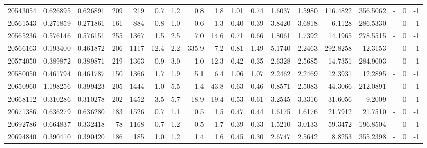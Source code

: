 \begin{tabular}{rrrrrrrrrrrrrrrlrr}
  20543054 & 0.626895 &   0.626891 &  209 &  219 &      0.7 &      1.2 &     0.8 &      1.8 &       1.01 &        0.74 &  1.6037 &  1.5980 &  116.4822 &  356.5062 &             - &        0 &         -1 \\
  20561543 & 0.271859 &   0.271861 &  161 &  884 &      0.8 &      1.0 &     0.6 &      1.3 &       0.40 &        0.39 &  3.8420 &  3.6818 &    6.1128 &  286.5330 &             - &        0 &         -1 \\
  20565236 & 0.576146 &   0.576151 &  255 & 1367 &      1.5 &      2.5 &     7.0 &     14.6 &       0.71 &        0.66 &  1.8061 &  1.7392 &   14.1965 &  278.5515 &             - &        0 &         -1 \\
  20566163 & 0.193400 &   0.461872 &  206 & 1117 &     12.4 &      2.2 &   335.9 &      7.2 &       0.81 &        1.49 &  5.1740 &  2.2463 &  292.8258 &   12.3153 &             - &        0 &         -1 \\
  20574050 & 0.389872 &   0.389871 &  219 & 1363 &      0.9 &      3.0 &     1.0 &     12.3 &       0.42 &        0.35 &  2.6328 &  2.5685 &   14.7351 &  284.9003 &             - &        0 &         -1 \\
  20580050 & 0.461794 &   0.461787 &  150 & 1366 &      1.7 &      1.9 &     5.1 &      6.4 &       1.06 &        1.07 &  2.2462 &  2.2469 &   12.3931 &   12.2895 &             - &        0 &         -1 \\
  20650960 & 1.198256 &   0.399423 &  205 & 1444 &      1.0 &      5.5 &     1.4 &     43.8 &       0.63 &        0.46 &  0.8571 &  2.5083 &   44.3066 &  212.0891 &             - &        0 &         -1 \\
  20668112 & 0.310286 &   0.310278 &  202 & 1452 &      3.5 &      5.7 &    18.9 &     19.4 &       0.53 &        0.61 &  3.2545 &  3.3316 &   31.6056 &    9.2009 &             - &        0 &         -1 \\
  20671386 & 0.636279 &   0.636280 &  183 & 1526 &      0.7 &      1.1 &     0.5 &      1.5 &       0.47 &        0.44 &  1.6175 &  1.6176 &   21.7912 &   21.7510 &             - &        0 &         -1 \\
  20692786 & 0.664837 &   0.332418 &   78 & 1168 &      0.7 &      1.2 &     0.5 &      1.7 &       0.39 &        0.33 &  1.5210 &  3.0133 &   59.3472 &  196.8504 &             - &        0 &         -1 \\
  20694840 & 0.390410 &   0.390420 &  186 &  185 &      1.0 &      1.2 &     1.4 &      1.6 &       0.45 &        0.30 &  2.6747 &  2.5642 &    8.8253 &  355.2398 &             - &        0 &         -1 \\

\end{tabular}
